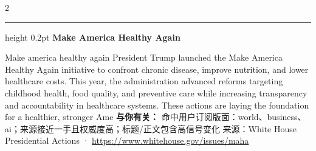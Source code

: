 \documentclass[10.5pt]{ctexart}
\begin{document}
\begin{multicols}{2}
\vspace{2mm}
\hrule height 0.2pt
\vspace{2mm}
{\large\bfseries Make America Healthy Again}\par
Make america healthy again President Trump launched the Make America Healthy Again initiative to confront chronic disease, improve nutrition, and lower healthcare costs. This year, the administration advanced reforms targeting childhood health, food quality, and preventive care while increasing transparency and accountability in healthcare systems. These actions are laying the foundation for a healthier, stronger Ame
\textbf{与你有关：} 命中用户订阅版面：world、business、ai；来源接近一手且权威度高；标题/正文包含高信号变化
{\footnotesize\color{ormuted} 来源：White House Presidential Actions · \url{https://www.whitehouse.gov/issues/maha}}
\end{multicols}
\end{document}
